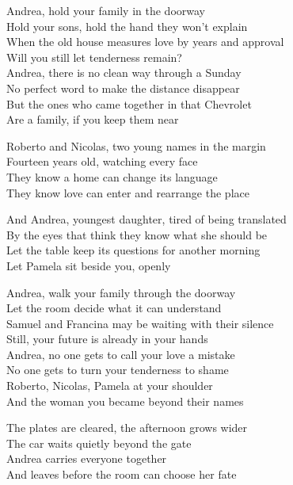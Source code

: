 \begin{lyrics}
Andrea, hold your family in the doorway\\
Hold your sons, hold the hand they won’t explain\\
When the old house measures love by years and approval\\
Will you still let tenderness remain?\\
Andrea, there is no clean way through a Sunday\\
No perfect word to make the distance disappear\\
But the ones who came together in that Chevrolet\\
Are a family, if you keep them near

Roberto and Nicolas, two young names in the margin\\
Fourteen years old, watching every face\\
They know a home can change its language\\
They know love can enter and rearrange the place

And Andrea, youngest daughter, tired of being translated\\
By the eyes that think they know what she should be\\
Let the table keep its questions for another morning\\
Let Pamela sit beside you, openly


Andrea, walk your family through the doorway\\
Let the room decide what it can understand\\
Samuel and Francina may be waiting with their silence\\
Still, your future is already in your hands\\
Andrea, no one gets to call your love a mistake\\
No one gets to turn your tenderness to shame\\
Roberto, Nicolas, Pamela at your shoulder\\
And the woman you became beyond their names

The plates are cleared, the afternoon grows wider\\
The car waits quietly beyond the gate\\
Andrea carries everyone together\\
And leaves before the room can choose her fate
\end{lyrics}
